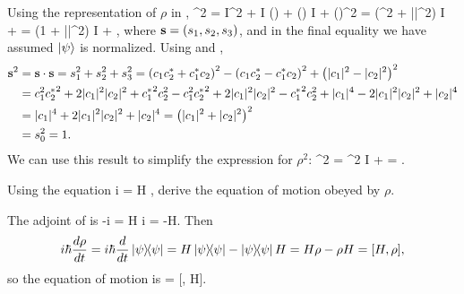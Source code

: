 \begin{solution}
	Using the representation of $\rho$ in ,
	\beq
		\rho^2 =  I^2 +  I (\sds) +  (\sds) I +  (\sds)^2
		=  (\soo^2 + |\vs|^2) I +  \sds
		=  (1 + |\vs|^2) I +  \sds,
	\eeq
	where $\mathbf{s} = (s_1, s_2, s_3)$, and in the final equality we have assumed $\ket{\psi}$ is normalized.  Using  and ,
	\begin{align*}
		\mathbf{s}^2 &= \mathbf{s} \cdot \mathbf{s} = s_1^2 + s_2^2 + s_3^2
		= \left( c_1 c_2^* + c_1^* c_2 \right)^2 - \left( c_1 c_2^* - c_1^* c_2 \right)^2 + \left( |c_1|^2 - |c_2|^2 \right)^2 \\
		&= c_1^2 {c_2^*}^2 + 2 |c_1|^2 |c_2|^2 + {c_1^*}^2 c_2^2 - c_1^2 {c_2^*}^2 + 2 |c_1|^2 |c_2|^2 - {c_1^*}^2 c_2^2 + |c_1|^4 - 2 |c_1|^2 |c_2|^2 + |c_2|^4 \\
		&= |c_1|^4 + 2 |c_1|^2 |c_2|^2 + |c_2|^4
		= \left( |c_1|^2 + |c_2|^2 \right)^2 \\
		&= s_0^2 = 1.
	\end{align*}
	We can use this result to simplify the expression for $\rho^2$:
	\beq
		\rho^2 =  \soo^2 I +  \sds = \rho.
	\eeq
\vfix
\end{solution}

\newcommand{\bpsi}{\bra{\psi}}
\newcommand{\rhot}{\rho(t)}

\clearpage
\begin{problem}
	Using the {\Schrodinger} equation
	\beqn \label{schro}
		i \hbar {} \kpsi = H \kpsi,
	\eeqn
	derive the equation of motion obeyed by $\rho$.
\end{problem}

\begin{solution}
	The adjoint of  is
	\beq
		-i \hbar {} \bpsi = \bpsi H
		\iff
		i \hbar {} \bpsi = -\bpsi H.
	\eeq
	Then
	\begin{align*}
		i \hbar \dv{\rho}{t} = i \hbar \dv{}{t} \ketbra{\psi}
		= H \ketbra{\psi} - \ketbra{\psi} H
		= H \rho - \rho H
		= [H, \rho],
	\end{align*}
	so the equation of motion is
	\beq
		 =  [\rho, H].
	\eeq
\vfix
\end{solution}

\newcommand{\vOme}{\boldsymbol{\Omega}}
\newcommand{\psiu}{\psi_\up}
\newcommand{\psid}{\psi_\dn}
\newcommand{\psiut}{\psiu(t)}
\newcommand{\psidt}{\psid(t)}
\newcommand{\kpsit}{\ket{\psit}}
\newcommand{\Ods}{\vOme \cdot \vsig}
\newcommand{\Omx}{\Omega_x}
\newcommand{\Omy}{\Omega_y}
\newcommand{\Omz}{\Omega_z}

